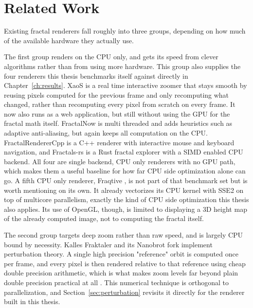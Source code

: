 \documentclass{ftndiplomski}
\begin{document}
\section{Related Work}
\label{sec:related-work}

Existing fractal renderers fall roughly into three groups, depending on how much of the available
hardware they actually use.

The first group renders on the CPU only, and gets its speed from clever algorithms rather than
from using more hardware. This group also supplies the four renderers this thesis benchmarks
itself against directly in Chapter~\ref{ch:results}. XaoS \cite{xaos2026} is a real time interactive
zoomer that stays smooth by reusing pixels computed for the previous frame and only recomputing
what changed, rather than recomputing every pixel from scratch on every frame. It now also runs as
a web application, but still without using the GPU for the fractal math itself. FractalNow
\cite{fractalnow2017} is multi threaded and adds heuristics such as adaptive anti-aliasing, but
again keeps all computation on the CPU. FractalRendererCpp \cite{fractalrenderercpp2021} is a C++
renderer with interactive mouse and keyboard navigation, and Fractals-rs \cite{fractalsrs2026} is a
Rust fractal explorer with a SIMD enabled CPU backend. All four are single backend, CPU only
renderers with no GPU path, which makes them a useful baseline for how far CPU side optimization
alone can go. A fifth CPU only renderer, Fraqtive \cite{fraqtive2023}, is not part of that
benchmark set but is worth mentioning on its own. It already vectorizes its CPU kernel with
SSE2 on top of multicore parallelism, exactly the kind of CPU side optimization this thesis also
applies. Its use of OpenGL, though, is limited to displaying a 3D height map of the already computed
image, not to computing the fractal itself.

The second group targets deep zoom rather than raw speed, and is largely CPU bound by necessity.
Kalles Fraktaler and its Nanobrot fork \cite{nanobrot2020} implement perturbation theory. A single
high precision "reference" orbit is computed once per frame, and every pixel is then rendered
relative to that reference using cheap double precision arithmetic, which is what makes zoom levels
far beyond plain double precision practical at all \cite{heilandallen2021deepzoom}. This numerical
technique is orthogonal to parallelization, and Section~\ref{sec:perturbation} revisits it directly
for the renderer built in this thesis.
\end{document}
